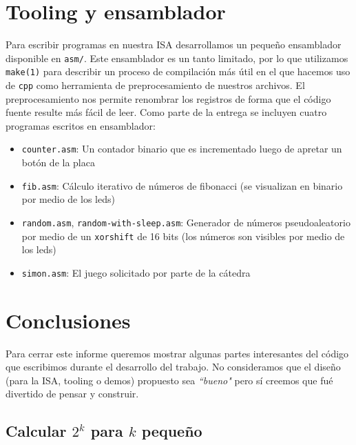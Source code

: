 \documentclass{article}
\begin{document}
\section{Tooling y ensamblador}
Para escribir programas en nuestra ISA desarrollamos un pequeño ensamblador disponible en \texttt{asm/}. Este ensamblador es un tanto limitado, por lo que utilizamos \texttt{make(1)} para describir un proceso de compilación más útil en el que hacemos uso de \texttt{cpp} como herramienta de preprocesamiento de nuestros archivos. El preprocesamiento nos permite renombrar los registros de forma que el código fuente resulte más fácil de leer.
Como parte de la entrega se incluyen cuatro programas escritos en ensamblador:
\begin{itemize}
    \item \texttt{counter.asm}: Un contador binario que es incrementado luego de apretar un botón de la placa
    \item \texttt{fib.asm}: Cálculo iterativo de números de fibonacci (se visualizan en binario por medio de los leds)
    \item \texttt{random.asm}, \texttt{random-with-sleep.asm}: Generador de números pseudoaleatorio por medio de un \texttt{xorshift} de 16 bits (los números son visibles por medio de los leds)
    \item \texttt{simon.asm}: El juego solicitado por parte de la cátedra
\end{itemize}

\section{Conclusiones}

Para cerrar este informe queremos mostrar algunas partes interesantes del código que escribimos durante el desarrollo del trabajo. No consideramos que el diseño (para la ISA, tooling o demos) propuesto sea \emph{``bueno"}  pero sí creemos que fué divertido de pensar y construir.

\subsection{Calcular $2^k$ para $k$ pequeño}
\end{document}
